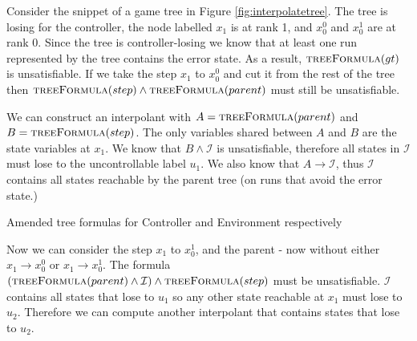 \documentclass{llncs}
\begin{document}
Consider the snippet of a game tree in Figure \ref{fig:interpolatetree}. The
tree is losing for the controller, the node labelled $x_1$ is at rank 1, and
$x_0^0$ and $x_0^1$ are at rank 0. Since the tree is controller-losing we know
that at least one run represented by the tree contains the error state.  As
a result, $\textsc{treeFormula}(gt)$ is unsatisfiable. If we take the step
$x_1$ to $x_0^0$ and cut it from the rest of the tree then
$\textsc{treeFormula}(step) \land \textsc{treeFormula}(parent)$ must still be
unsatisfiable.

We can construct an interpolant with $A = \textsc{treeFormula}(parent)$ and $B
= \textsc{treeFormula}(step)$. The only variables shared between $A$ and $B$
are the state variables at $x_1$. We know that $B \land \mathcal{I}$ is
unsatisfiable, therefore all states in $\mathcal{I}$ must lose to the
uncontrollable label $u_1$. We also know that $A \to \mathcal{I}$, thus
$\mathcal{I}$ contains all states reachable by the parent tree (on runs that
avoid the error state.)

\begin{algorithm}
    \caption{Amended tree formulas for Controller and Environment respectively}
    \label{alg:treeFormula}
    \begin{algorithmic}
        \State {}
        \Else
        \State {}
        \EndIf
        \EndFunction
    \end{algorithmic}

    \begin{algorithmic}
        \State {}
        \Else
        \State {}
        \EndIf
        \EndFunction
    \end{algorithmic}
\end{algorithm}

Now we can consider the step $x_1$ to $x_0^1$, and the parent - now without
either $x_1 \to x_0^0$ or $x_1 \to x_0^1$. The formula
$(\textsc{treeFormula}(parent) \land \mathcal{I}) \land
\textsc{treeFormula}(step)$ must be unsatisfiable. $\mathcal{I}$ contains all
states that lose to $u_1$ so any other state reachable at $x_1$ must lose to
$u_2$. Therefore we can compute another interpolant that contains states that
lose to $u_2$.
\end{document}

